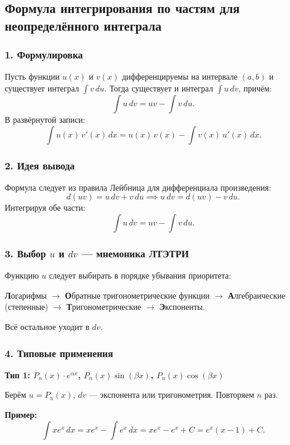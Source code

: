 \subsection{Формула интегрирования по частям для неопределённого интеграла}

\subsubsection*{1. Формулировка}

\begin{theorem}
Пусть функции $u(x)$ и $v(x)$ дифференцируемы на интервале $(a, b)$ и существует интеграл $\int v\,du$. Тогда существует и интеграл $\int u\,dv$, причём:
\[ \int u\,dv = uv - \int v\,du. \]
В развёрнутой записи:
\[ \int u(x)\,v'(x)\,dx = u(x)\,v(x) - \int v(x)\,u'(x)\,dx. \]
\end{theorem}

\subsubsection*{2. Идея вывода}

Формула следует из правила Лейбница для дифференциала произведения:
\[ d(uv) = u\,dv + v\,du \implies u\,dv = d(uv) - v\,du. \]
Интегрируя обе части:
\[ \int u\,dv = uv - \int v\,du. \]

\subsubsection*{3. Выбор $u$ и $dv$ — мнемоника ЛТЭТРИ}

Функцию $u$ следует выбирать в порядке убывания приоритета:
\begin{center}
\textbf{Л}огарифмы $\to$ \textbf{О}братные тригонометрические функции $\to$
\textbf{А}лгебраические (степенные) $\to$ \textbf{Т}ригонометрические $\to$
\textbf{Э}кспоненты.
\end{center}
Всё остальное уходит в $dv$.

\subsubsection*{4. Типовые применения}

\textbf{Тип 1: $P_n(x) \cdot e^{\alpha x}$, $P_n(x)\sin(\beta x)$, $P_n(x)\cos(\beta x)$}

Берём $u = P_n(x)$, $dv$ — экспонента или тригонометрия. Повторяем $n$ раз.

\textbf{Пример:}
\[
\int x e^x\,dx = x e^x - \int e^x\,dx = x e^x - e^x + C = e^x(x-1)+C.
\]

